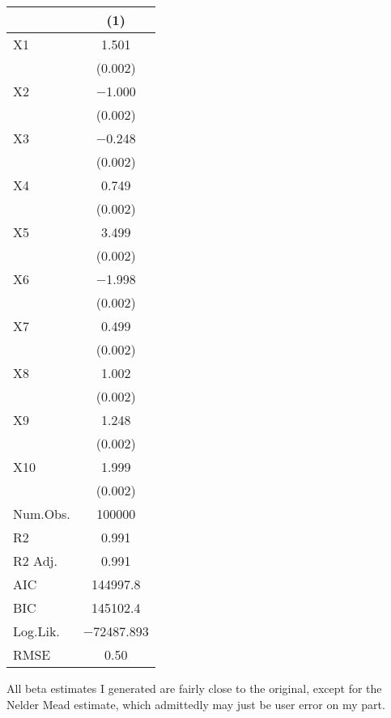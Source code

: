 \documentclass{article}
\begin{document}
\begin{table}
\centering
\begin{tabular}[t]{lc}
\toprule
  & (1)\\
\midrule
X1 & \num{1.501}\\
 & \vphantom{9} (\num{0.002})\\
X2 & \num{-1.000}\\
 & \vphantom{8} (\num{0.002})\\
X3 & \num{-0.248}\\
 & \vphantom{7} (\num{0.002})\\
X4 & \num{0.749}\\
 & \vphantom{6} (\num{0.002})\\
X5 & \num{3.499}\\
 & \vphantom{5} (\num{0.002})\\
X6 & \num{-1.998}\\
 & \vphantom{4} (\num{0.002})\\
X7 & \num{0.499}\\
 & \vphantom{3} (\num{0.002})\\
X8 & \num{1.002}\\
 & \vphantom{2} (\num{0.002})\\
X9 & \num{1.248}\\
 & \vphantom{1} (\num{0.002})\\
X10 & \num{1.999}\\
 & (\num{0.002})\\
\midrule
Num.Obs. & \num{100000}\\
R2 & \num{0.991}\\
R2 Adj. & \num{0.991}\\
AIC & \num{144997.8}\\
BIC & \num{145102.4}\\
Log.Lik. & \num{-72487.893}\\
RMSE & \num{0.50}\\
\bottomrule
\end{tabular}
\end{table}

All beta estimates I generated are fairly close to the original, except for the Nelder Mead estimate, which admittedly may just be user error on my part.
\end{document}
